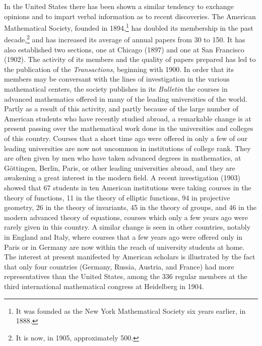 \documentclass[oneside]{book}
\begin{document}
{In the United States there has been shown a similar tendency
to exchange opinions and to impart verbal information
as to recent discoveries. The American Mathematical Society,
founded in 1894,\footnote{It was founded as the New York
Mathematical Society six years earlier, in 1888.} has doubled
its membership in the past decade,\footnote{It is now, in 1905,
approximately 500.}
and has increased its average of annual papers from 30 to 150.
It has also established two sections, one at Chicago (1897) and
one at San Francisco (1902). The activity of its members and
the quality of papers prepared has led to the publication of the
\emph{Transactions}, beginning with 1900. In order that its members
may be conversant with the lines of investigation in the various
mathematical centers, the society publishes in its \emph{Bulletin} the
courses in advanced mathematics offered in many of the leading
universities of the world. Partly as a result of this activity,
and partly because of the large number of American students
who have recently studied abroad, a remarkable change is at
present passing over the mathematical work done in the universities
and colleges of this country. Courses that a short time ago
were offered in only a few of our leading universities are now
not uncommon in institutions of college rank. They are often
given by men who have taken advanced degrees in mathematics,
at G\"ottingen, Berlin, Paris, or other leading universities abroad,
and they are awakening a great interest in the modern field.
A recent investigation (1903) showed that 67 students in ten
American institutions were taking courses in the theory of functions,
11 in the theory of elliptic functions, 94 in projective geometry,
26 in the theory of invariants, 45 in the theory of groups,
and 46 in the modern advanced theory of equations, courses
which only a few years ago were rarely given in this country.
A similar change is seen in other countries, notably in England
and Italy, where courses that a few years ago were offered only
in Paris or in Germany are now within the reach of university
students at home. The interest at present manifested by American
scholars is illustrated by the fact that only four countries (Germany,
Russia, Austria, and France) had more representatives
than the United States, among the 336 regular members at the
third international mathematical congress at Heidelberg in 1904.

}
\end{document}

